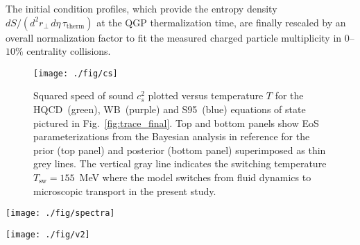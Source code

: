 \documentclass[aps,prc,reprint,amsmath,nofootinbib,superscriptaddress]{revtex4-1}
\newcommand{\hotqcd}{HQCD~}
\newcommand{\wb}{WB~}
\newcommand{\spv}{S95~}
\begin{document}
The initial condition profiles, which provide the entropy density $dS/(d^2r_\perp\, d\eta\, \tau_\text{therm})$ at the QGP thermalization time, are finally 
rescaled by an overall normalization factor to fit the measured charged particle multiplicity in $0$--$10\%$ centrality collisions.

\begin{figure}
  \texttt{[image: ./fig/cs]}
  \caption{\label{fig:cs} Squared speed of sound $c_s^2$ plotted versus temperature $T$ for the \hotqcd (green), \wb (purple) and \spv (blue) equations of state pictured in 
           Fig.~\ref{fig:trace_final}. Top and bottom panels show EoS parameterizations from the Bayesian analysis in reference \cite{?} for the prior (top panel) and posterior 
           (bottom panel) superimposed as thin grey lines. The vertical gray line indicates the switching temperature $T_\text{sw} = 155$~MeV where the model switches from fluid 
           dynamics to microscopic transport in the present study.}
\end{figure}

\begin{figure*}[t]
  \texttt{[image: ./fig/spectra]}
  \caption{
    \label{fig:spectra} Effect of the equation of state on transverse momentum spectra. Top row: model calculations using the \hotqcd equation of state plotted against 
    PHENIX data for pions, kaons and protons (blue lines/circles, red lines/squares and green lines/triangles) in centrality bins $0$--$5\%$, $20$--$30\%$ and $40$--$50\%$ 
    (columns left to right). Middle and bottom rows: ratios of the \wb and \spv invariant yields to the \hotqcd result. Shaded bands indicate two sigma statistical error. }
\end{figure*}

\begin{figure*}[t]
  \texttt{[image: ./fig/v2]}
  \caption{
    \label{fig:v2} Effect of the equation of state on differential elliptic flow $v_2(p_T)$ calculated from the Cooper-Frye freezeout hypersurface \eqref{differential_flow}.
    Top row: model calculations using the \hotqcd equation of state for the elliptic flow $v_2(p_T)$  of pions, kaons and protons (blue, orange and green lines) 
    in centrality bins $0$--$10\%$, $20$--$30\%$ and $40$--$50\%$ (columns left to right). Middle and bottom rows: ratios of the \wb and \spv elliptic flow to 
    the \hotqcd result. Statistical errors are smaller than the linewidth and have been omitted.
  }
\end{figure*}
\end{document}
